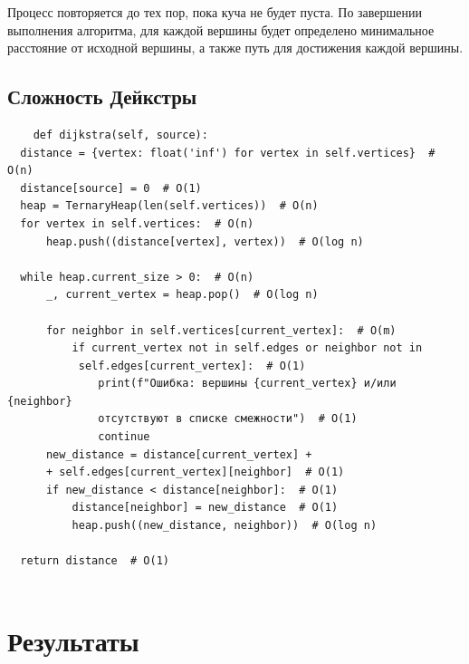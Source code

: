 \documentclass[a4paper, 12pt]{article}
\theoremstyle{definition}
\begin{document}
		Процесс повторяется до тех пор, пока куча не будет пуста. По завершении выполнения алгоритма, для каждой вершины будет определено минимальное расстояние от исходной вершины, а также путь для достижения каждой вершины.\newline
		\subsection{Сложность Дейкстры}
		\begin{verbatim}
	def dijkstra(self, source):
  distance = {vertex: float('inf') for vertex in self.vertices}  # O(n)
  distance[source] = 0  # O(1)
  heap = TernaryHeap(len(self.vertices))  # O(n)
  for vertex in self.vertices:  # O(n)
      heap.push((distance[vertex], vertex))  # O(log n)
		
  while heap.current_size > 0:  # O(n)
      _, current_vertex = heap.pop()  # O(log n)
		
      for neighbor in self.vertices[current_vertex]:  # O(m)
          if current_vertex not in self.edges or neighbor not in
           self.edges[current_vertex]:  # O(1)
              print(f"Ошибка: вершины {current_vertex} и/или {neighbor}
              отсутствуют в списке смежности")  # O(1)
              continue
      new_distance = distance[current_vertex] +
      + self.edges[current_vertex][neighbor]  # O(1)
      if new_distance < distance[neighbor]:  # O(1)
          distance[neighbor] = new_distance  # O(1)
          heap.push((new_distance, neighbor))  # O(log n)
		
  return distance  # O(1)
			
		\end{verbatim}
	
	
	\section{Результаты}
\end{document}
